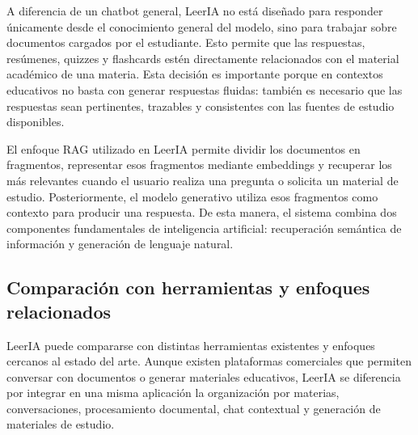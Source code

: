 \documentclass[12pt, letterpaper]{article}
\begin{document}
	A diferencia de un chatbot general, LeerIA no está diseñado para responder únicamente desde el conocimiento general del modelo, sino para trabajar sobre documentos cargados por el estudiante. Esto permite que las respuestas, resúmenes, quizzes y flashcards estén directamente relacionados con el material académico de una materia. Esta decisión es importante porque en contextos educativos no basta con generar respuestas fluidas: también es necesario que las respuestas sean pertinentes, trazables y consistentes con las fuentes de estudio disponibles.
	
	El enfoque RAG utilizado en LeerIA permite dividir los documentos en fragmentos, representar esos fragmentos mediante embeddings y recuperar los más relevantes cuando el usuario realiza una pregunta o solicita un material de estudio. Posteriormente, el modelo generativo utiliza esos fragmentos como contexto para producir una respuesta. De esta manera, el sistema combina dos componentes fundamentales de inteligencia artificial: recuperación semántica de información y generación de lenguaje natural.
	
	\subsection{Comparación con herramientas y enfoques relacionados}
	
	LeerIA puede compararse con distintas herramientas existentes y enfoques cercanos al estado del arte. Aunque existen plataformas comerciales que permiten conversar con documentos o generar materiales educativos, LeerIA se diferencia por integrar en una misma aplicación la organización por materias, conversaciones, procesamiento documental, chat contextual y generación de materiales de estudio.
	
\end{document}
